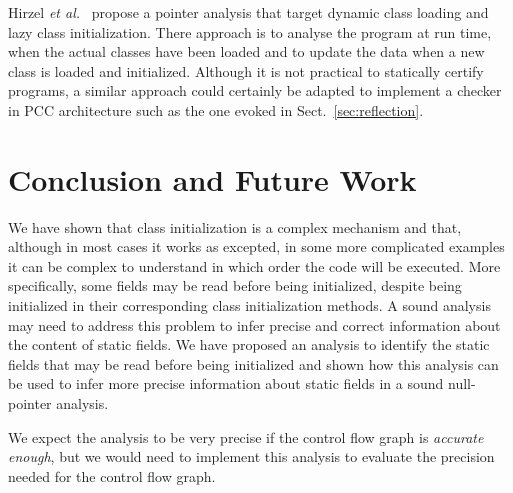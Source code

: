 \documentclass{entcs}
\begin{document}
Hirzel \emph{et
  al.}~\cite{hirzel04:pointer_analysis_dynamic_class_loading} propose
a pointer analysis that target dynamic class loading and lazy class
initialization.  There approach is to analyse the program at run time,
when the actual classes have been loaded and to update the data when a
new class is loaded and initialized.  Although it is not practical to
statically certify programs, a similar approach could certainly be
adapted to implement a checker in PCC architecture such as the one
evoked in Sect.~\ref{sec:reflection}.


\section{Conclusion and Future Work}
\label{sec:conclusion}
We have shown that class initialization is a complex mechanism and
that, although in most cases it works as excepted, in some more
complicated examples it can be complex to understand in which
order the code will be executed.  More specifically, some fields may
be read before being initialized, despite being initialized in their
corresponding class initialization methods.
A sound analysis may need to address this problem to infer precise and
correct information about the content of static fields.
We have proposed an analysis to identify the static fields that may be
read before being initialized and shown how this analysis can be used
to infer more precise information about static fields in a sound
null-pointer analysis.

We expect the analysis to be very precise if the control flow graph is
\emph{accurate enough}, but we would need to implement this analysis
to evaluate the precision needed for the control flow graph.


 
\end{document}
